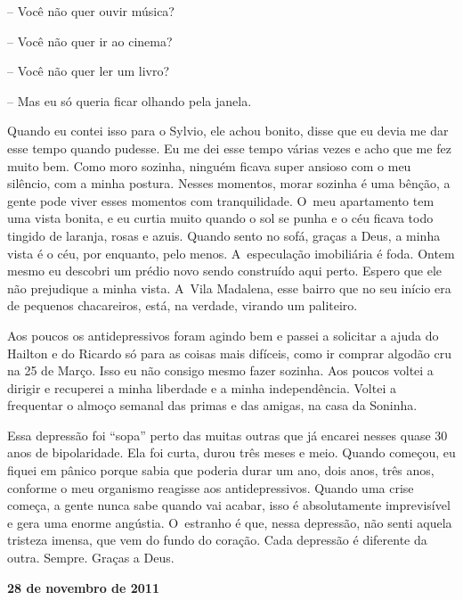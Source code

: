 -- Você não quer ouvir música?

-- Você não quer ir ao cinema?

-- Você não quer ler um livro?

-- Mas eu só queria ficar olhando pela janela.

Quando eu contei isso para o Sylvio, ele achou bonito, disse que eu
devia me dar esse tempo quando pudesse. Eu me dei esse tempo várias
vezes e acho que me fez muito bem. Como moro sozinha, ninguém ficava
super ansioso com o meu silêncio, com a minha postura. Nesses momentos,
morar sozinha é uma bênção, a gente pode viver esses momentos com
tranquilidade. O~meu apartamento tem uma vista bonita, e eu curtia muito
quando o sol se punha e o céu ficava todo tingido de laranja, rosas e
azuis. Quando sento no sofá, graças a Deus, a minha vista é o céu, por
enquanto, pelo menos. A~especulação imobiliária é foda. Ontem mesmo eu
descobri um prédio novo sendo construído aqui perto. Espero que ele não
prejudique a minha vista. A~Vila Madalena, esse bairro que no seu início
era de pequenos chacareiros, está, na verdade, virando um paliteiro.

Aos poucos os antidepressivos foram agindo bem e passei a solicitar a
ajuda do Hailton e do Ricardo só para as coisas mais difíceis, como ir
comprar algodão cru na 25 de Março. Isso eu não consigo mesmo fazer
sozinha. Aos poucos voltei a dirigir e recuperei a minha liberdade e a
minha independência. Voltei a frequentar o almoço semanal das primas e
das amigas, na casa da Soninha.

Essa depressão foi ``sopa'' perto das muitas outras que já encarei
nesses quase 30 anos de bipolaridade. Ela foi curta, durou três meses e
meio. Quando começou, eu fiquei em pânico porque sabia que poderia durar
um ano, dois anos, três anos, conforme o meu organismo reagisse
aos antidepressivos. Quando uma crise começa, a gente nunca sabe quando
vai acabar, isso é absolutamente imprevisível e gera uma enorme
angústia. O~estranho é que, nessa depressão, não senti aquela tristeza
imensa, que vem do fundo do coração. Cada depressão é diferente da
outra. Sempre. Graças a Deus.

\begin{center}\asterisc{}\end{center}


\textbf{}

\begin{flushright}\textbf{28 de novembro de 2011}\end{flushright}


